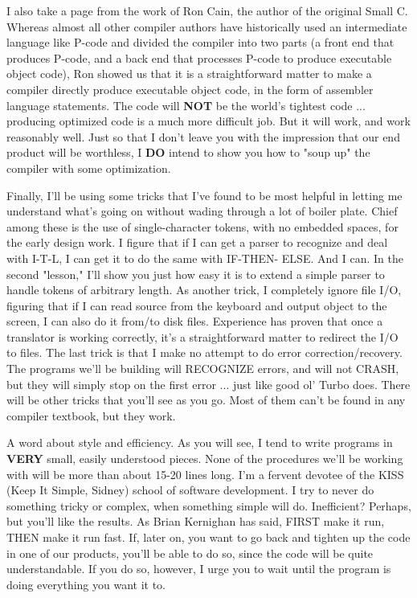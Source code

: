 I  also take a page from the work of Ron Cain, the author of  the
original Small C.  Whereas almost all other compiler authors have
historically  used  an  intermediate  language  like  P-code  and
divided  the  compiler  into two parts (a front end that produces
P-code,  and   a  back  end  that  processes  P-code  to  produce
executable   object  code),  Ron  showed  us   that   it   is   a
straightforward  matter  to  make  a  compiler  directly  produce
executable  object  code,  in  the  form  of  assembler  language
statements.  The code will 	\textbf{NOT} be the world's tightest code ...
producing optimized code is  a  much  more  difficult job. But it
will work, and work reasonably well.  Just so that I  don't leave
you with the impression that our end product will be worthless, I
\textbf{DO} intend to show you how  to  "soup up" the compiler with some
optimization.



Finally, I'll be  using  some  tricks  that I've found to be most
helpful in letting  me  understand what's going on without wading
through a lot of boiler plate.  Chief among these  is  the use of
single-character tokens, with no embedded spaces,  for  the early
design work.  I figure that  if  I  can get a parser to recognize
and deal with I-T-L, I can  get  it  to do the same with IF-THEN-
ELSE.  And I can.  In the second "lesson,"   I'll  show  you just
how easy it  is  to  extend  a  simple parser to handle tokens of
arbitrary length.  As another  trick,  I  completely  ignore file
I/O, figuring that  if  I  can  read source from the keyboard and
output object to the screen, I can also do it from/to disk files.
Experience  has  proven  that  once  a   translator   is  working
correctly, it's a  straightforward  matter to redirect the I/O to
files.    The last trick is that I make no attempt  to  do  error
correction/recovery.   The   programs   we'll  be  building  will
RECOGNIZE errors, and will not CRASH, but they  will  simply stop
on the first error ... just like good ol' Turbo does.  There will
be  other tricks that you'll see as you go. Most of them can't be
found in any compiler textbook, but they work.

A word about style and efficiency.    As  you will see, I tend to
write programs in  \textbf{VERY}  small, easily understood pieces.  None
of the procedures we'll  be  working with will be more than about
15-20 lines long.  I'm a fervent devotee  of  the  KISS  (Keep It
Simple, Sidney) school of software development.  I  try  to never
do something tricky or  complex,  when  something simple will do.
Inefficient?  Perhaps, but you'll like the  results.    As  Brian
Kernighan has said,  FIRST  make  it  run, THEN make it run fast.
If, later on,  you want to go back and tighten up the code in one
of  our products, you'll be able to do so, since the code will be
quite understandable. If you  do  so, however, I urge you to wait
until the program is doing everything you want it to.

